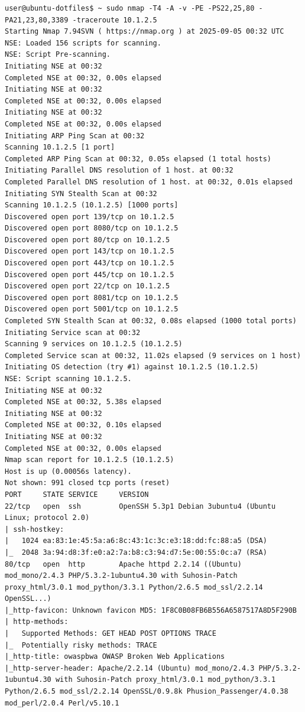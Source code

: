 \documentclass[12pt]{article}
\begin{document}
\begin{lstlisting}
user@ubuntu-dotfiles$ ~ sudo nmap -T4 -A -v -PE -PS22,25,80 -PA21,23,80,3389 -traceroute 10.1.2.5
Starting Nmap 7.94SVN ( https://nmap.org ) at 2025-09-05 00:32 UTC
NSE: Loaded 156 scripts for scanning.
NSE: Script Pre-scanning.
Initiating NSE at 00:32
Completed NSE at 00:32, 0.00s elapsed
Initiating NSE at 00:32
Completed NSE at 00:32, 0.00s elapsed
Initiating NSE at 00:32
Completed NSE at 00:32, 0.00s elapsed
Initiating ARP Ping Scan at 00:32
Scanning 10.1.2.5 [1 port]
Completed ARP Ping Scan at 00:32, 0.05s elapsed (1 total hosts)
Initiating Parallel DNS resolution of 1 host. at 00:32
Completed Parallel DNS resolution of 1 host. at 00:32, 0.01s elapsed
Initiating SYN Stealth Scan at 00:32
Scanning 10.1.2.5 (10.1.2.5) [1000 ports]
Discovered open port 139/tcp on 10.1.2.5
Discovered open port 8080/tcp on 10.1.2.5
Discovered open port 80/tcp on 10.1.2.5
Discovered open port 143/tcp on 10.1.2.5
Discovered open port 443/tcp on 10.1.2.5
Discovered open port 445/tcp on 10.1.2.5
Discovered open port 22/tcp on 10.1.2.5
Discovered open port 8081/tcp on 10.1.2.5
Discovered open port 5001/tcp on 10.1.2.5
Completed SYN Stealth Scan at 00:32, 0.08s elapsed (1000 total ports)
Initiating Service scan at 00:32
Scanning 9 services on 10.1.2.5 (10.1.2.5)
Completed Service scan at 00:32, 11.02s elapsed (9 services on 1 host)
Initiating OS detection (try #1) against 10.1.2.5 (10.1.2.5)
NSE: Script scanning 10.1.2.5.
Initiating NSE at 00:32
Completed NSE at 00:32, 5.38s elapsed
Initiating NSE at 00:32
Completed NSE at 00:32, 0.10s elapsed
Initiating NSE at 00:32
Completed NSE at 00:32, 0.00s elapsed
Nmap scan report for 10.1.2.5 (10.1.2.5)
Host is up (0.00056s latency).
Not shown: 991 closed tcp ports (reset)
PORT     STATE SERVICE     VERSION
22/tcp   open  ssh         OpenSSH 5.3p1 Debian 3ubuntu4 (Ubuntu Linux; protocol 2.0)
| ssh-hostkey: 
|   1024 ea:83:1e:45:5a:a6:8c:43:1c:3c:e3:18:dd:fc:88:a5 (DSA)
|_  2048 3a:94:d8:3f:e0:a2:7a:b8:c3:94:d7:5e:00:55:0c:a7 (RSA)
80/tcp   open  http        Apache httpd 2.2.14 ((Ubuntu) mod_mono/2.4.3 PHP/5.3.2-1ubuntu4.30 with Suhosin-Patch proxy_html/3.0.1 mod_python/3.3.1 Python/2.6.5 mod_ssl/2.2.14 OpenSSL...)
|_http-favicon: Unknown favicon MD5: 1F8C0B08FB6B556A6587517A8D5F290B
| http-methods: 
|   Supported Methods: GET HEAD POST OPTIONS TRACE
|_  Potentially risky methods: TRACE
|_http-title: owaspbwa OWASP Broken Web Applications
|_http-server-header: Apache/2.2.14 (Ubuntu) mod_mono/2.4.3 PHP/5.3.2-1ubuntu4.30 with Suhosin-Patch proxy_html/3.0.1 mod_python/3.3.1 Python/2.6.5 mod_ssl/2.2.14 OpenSSL/0.9.8k Phusion_Passenger/4.0.38 mod_perl/2.0.4 Perl/v5.10.1

\end{lstlisting}
\end{document}
